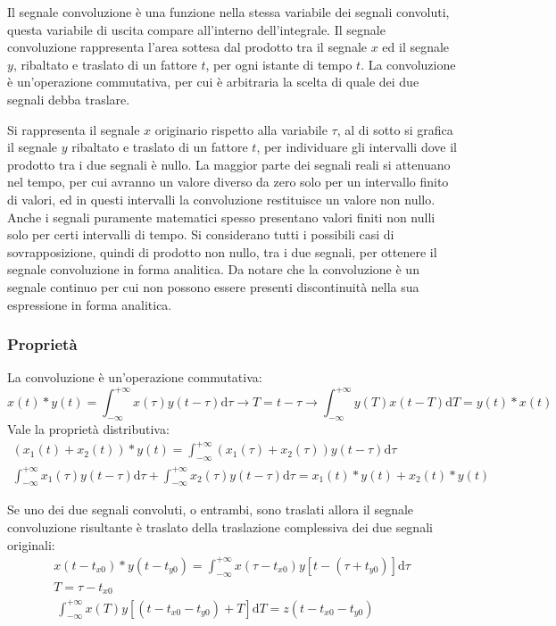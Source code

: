 \documentclass{article}
\newcommand{\df}{\mathrm{d}}
\numberwithin{equation}{subsection}
\begin{document}
Il segnale convoluzione è una funzione nella stessa variabile dei segnali convoluti, questa variabile di uscita compare all'interno dell'integrale. Il segnale convoluzione 
rappresenta l'area sottesa dal prodotto tra il segnale $x$ ed il segnale $y$, ribaltato e traslato di un fattore $t$, per ogni istante di tempo $t$. La convoluzione 
è un'operazione commutativa, per cui è arbitraria la scelta di quale dei due segnali debba traslare. 

Si rappresenta il segnale $x$ originario rispetto alla variabile $\tau$, al di sotto si grafica il segnale $y$ ribaltato e traslato di un fattore $t$, per individuare gli 
intervalli dove il prodotto tra i due segnali è nullo. La maggior parte dei segnali reali si attenuano nel tempo, per cui avranno un valore diverso da zero solo per un 
intervallo finito di valori, ed in questi intervalli la convoluzione restituisce un valore non nullo. Anche i segnali puramente matematici spesso presentano valori finiti 
non nulli solo per certi intervalli di tempo. Si considerano tutti i possibili casi di sovrapposizione, quindi di prodotto non nullo, tra i due segnali, per ottenere 
il segnale convoluzione in forma analitica. Da notare che la convoluzione è un segnale continuo per cui non possono essere presenti discontinuità nella sua espressione 
in forma analitica. 

\subsubsection{Proprietà}

La convoluzione è un'operazione commutativa:
\begin{equation*}
    x(t)*y(t)=\displaystyle\int_{-\infty}^{+\infty}x(\tau)y(t-\tau)\df\tau\to{T=t-\tau}\to \int_{-\infty}^{+\infty}y(T)x(t-T)\df T=y(t)*x(t)
\end{equation*}
Vale la proprietà distributiva:
\begin{gather*}
    (x_1(t)+x_2(t))*y(t)=\displaystyle\int_{-\infty}^{+\infty}(x_1(\tau)+x_2(\tau))y(t-\tau)\df\tau\\
    \int_{-\infty}^{+\infty}x_1(\tau)y(t-\tau)\df\tau+\int_{-\infty}^{+\infty}x_2(\tau)y(t-\tau)\df\tau=x_1(t)*y(t)+x_2(t)*y(t)
\end{gather*}

Se uno dei due segnali convoluti, o entrambi, sono traslati allora il segnale convoluzione risultante è traslato della traslazione complessiva dei due segnali originali:
\begin{gather*}
    x(t-t_{x0})*y(t-t_{y0})=\displaystyle\int_{-\infty}^{+\infty}x(\tau-t_{x0})y[t-(\tau+t_{y0})]\df\tau\\
    {T=\tau-t_{x0}}\\\
    \int_{-\infty}^{+\infty}x(T)y[(t-t_{x0}-t_{y0})+T]\df T=z(t-t_{x0}-t_{y0})
\end{gather*}
\end{document}
